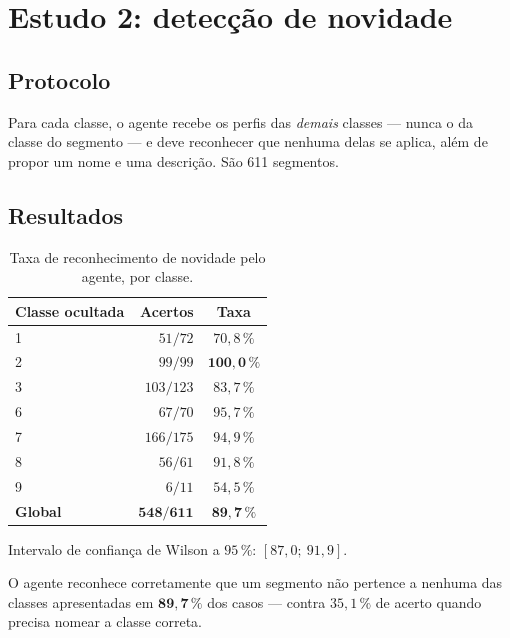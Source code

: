 \section{Estudo 2: detecção de novidade}

\subsection{Protocolo}

Para cada classe, o agente recebe os perfis das \emph{demais} classes --- nunca o da
classe do segmento --- e deve reconhecer que nenhuma delas se aplica, além de propor um
nome e uma descrição. São 611 segmentos.

\subsection{Resultados}

\begin{table}[htbp]
\centering
\caption{Taxa de reconhecimento de novidade pelo agente, por classe.}
\label{tab:ag-novidade}
\small
\begin{tabular}{lrc}
\toprule
\textbf{Classe ocultada} & \textbf{Acertos} & \textbf{Taxa} \\
\midrule
1 & $51/72$   & $70{,}8\,\%$ \\
2 & $99/99$   & $\bm{100{,}0\,\%}$ \\
3 & $103/123$ & $83{,}7\,\%$ \\
6 & $67/70$   & $95{,}7\,\%$ \\
7 & $166/175$ & $94{,}9\,\%$ \\
8 & $56/61$   & $91{,}8\,\%$ \\
9 & $6/11$    & $54{,}5\,\%$ \\
\midrule
\textbf{Global} & $\bm{548/611}$ & $\bm{89{,}7\,\%}$ \\
\bottomrule
\end{tabular}
\end{table}

Intervalo de confiança de Wilson a $95\,\%$: $[87{,}0;\ 91{,}9]$.

\begin{resultadochave}
O agente reconhece corretamente que um segmento não pertence a nenhuma das classes
apresentadas em $\bm{89{,}7\,\%}$ dos casos --- contra $35{,}1\,\%$ de acerto quando
precisa nomear a classe correta.
\end{resultadochave}

